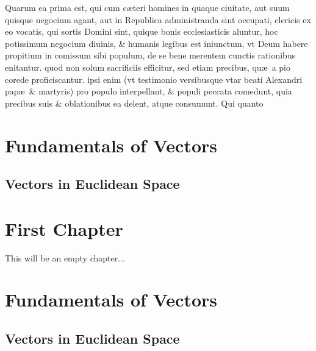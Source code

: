 \documentclass[a5paper,10pt]{book}
\def\ae{æ}
\begin{document}
Quarum ea prima est, qui cum c\ae teri homines in quaque ciuitate, aut suum quisque negocium agant, aut in Republica administranda sint occupati, clericis ex eo vocatis, qui sortis Domini sint, quique bonis ecclesiasticis aluntur, hoc potissimum negocium diuinis, \& humanis legibus est iniunctum, vt Deum habere propitium in comissum sibi populum, de se bene merentem cunctis rationibus enitantur.
quod %
non solum sacrificiis efficitur, sed etiam precibus, qu\ae \ a pio corede proficiscantur.
ipsi %
enim (vt testimonio versibusque vtar beati Alexandri pap\ae \ \& martyris) pro populo interpellant, \& populi peccata comedunt, quia precibus suis \& oblationibus ea delent, atque consumunt.
Qui quanto

\chapter{Fundamentals of Vectors}

\section{Vectors in Euclidean Space}



\chapter{First Chapter}

This will be an empty chapter...

\newpage
\thispagestyle{empty}
\mbox{}
\newpage

\chapter{Fundamentals of Vectors}

\section{Vectors in Euclidean Space}
\end{document}
